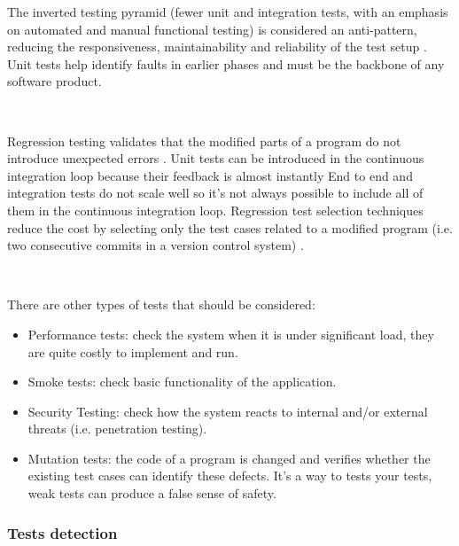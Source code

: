 \documentclass[11pt,english]{article} %
\begin{document}
The inverted testing pyramid (fewer unit and integration tests, with an emphasis on automated and manual functional testing) is considered an anti-pattern, reducing the responsiveness, maintainability and reliability of the test setup \cite{test-pyramid}. 
Unit tests help identify faults in earlier phases \cite{test-pyramid} and must be the backbone of any software product.

\

Regression testing validates that the modified parts of a program do not introduce unexpected errors \cite{an-overview-of-regression-testing}.
Unit tests can be introduced in the continuous integration loop because their feedback is almost instantly
End to end and integration tests do not scale well %
so it's not always possible to include all of them in the continuous integration loop.
Regression test selection techniques reduce the cost by selecting only the test cases related to a modified program (i.e. two consecutive commits in a version control system) \cite{regression-test-selection}.

\

There are other types of tests that should be considered:
\begin{itemize}
	\item Performance tests: check the system when it is under significant load, they are quite costly to implement and run. %
	\item Smoke tests: check basic functionality of the application. %
	\item Security Testing: check how the system reacts to internal and/or external threats (i.e. penetration testing). %
	\item Mutation tests: the code of a program is changed and verifies whether the existing test cases can identify these defects. It's a way to tests your tests, weak tests can produce a false sense of safety. %
\end{itemize}

\subsubsection{Tests detection}
\end{document}
